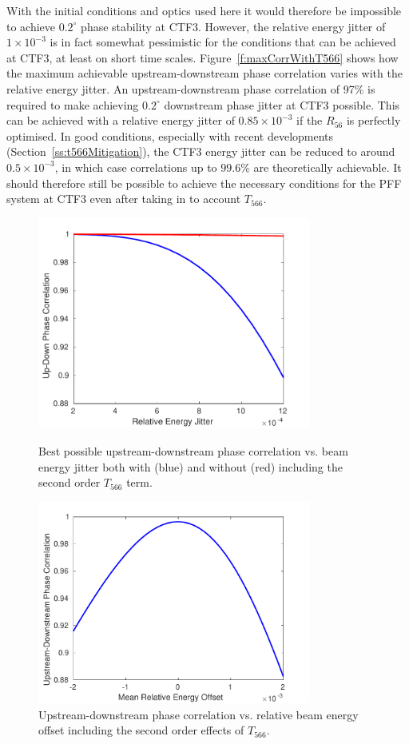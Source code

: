 With the initial conditions and optics used here it would therefore be impossible to achieve \(0.2^\circ\) phase stability at CTF3. However, the relative energy jitter of \(1\times10^{-3}\) is in fact somewhat pessimistic for the conditions that can be achieved at CTF3, at least on short time scales. Figure~\ref{f:maxCorrWithT566} shows how the maximum achievable upstream-downstream phase correlation varies with the relative energy jitter. An upstream-downstream phase correlation of 97\% is required to make achieving \(0.2^\circ\) downstream phase jitter at CTF3 possible. This can be achieved with a relative energy jitter of \(0.85\times10^{-3}\) if the \(R_{56}\) is perfectly optimised. In good conditions, especially with recent developments (Section~\ref{ss:t566Mitigation}), the CTF3 energy jitter can be reduced to around \(0.5\times10^{-3}\), in which case correlations up to \(99.6\%\) are theoretically achievable. It should therefore still be possible to achieve the necessary conditions for the PFF system at CTF3 even after taking in to account \(T_{566}\).

\begin{figure}
  \centering
  \includegraphics[width=0.8\textwidth]{Figures/propagation/maxCorrWithT566}
  \caption{Best possible upstream-downstream phase correlation vs. beam energy jitter both with (blue) and without (red) including the second order \(T_{566}\) term.}
  \label{f:maxCorrWithT566}
  \centering
  \includegraphics[width=0.8\textwidth]{Figures/propagation/corrVsEnergyOffset}
  \caption{Upstream-downstream phase correlation vs. relative beam energy offset including the second order effects of \(T_{566}\).}
  \label{f:corrVsEnergyOffset}
\end{figure}

